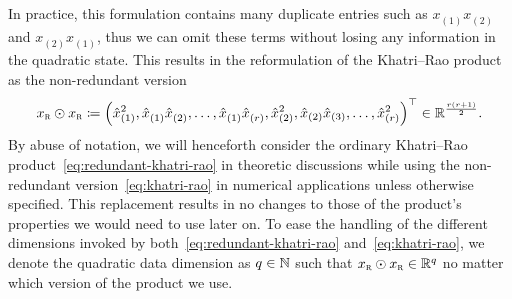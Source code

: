 In practice, this formulation contains many duplicate entries such as $x_{(1)}^{\phantom{1}} x_{(2)}^{\phantom{1}}$ and $x_{(2)}^{\phantom{1}} x_{(1)}^{\phantom{1}}$, thus we can omit these terms without losing any information in the quadratic state.
This results in the reformulation of the Khatri--Rao product as the non-redundant version
\begin{equation}\label{eq:khatri-rao}
    x_{\textnormal{\scshape r}} \odot x_{\textnormal{\scshape r}} \coloneqq {\left( \hat{x}_{(1)}^2, \hat{x}_{(1)}^{\phantom{1}} \hat{x}_{(2)}^{\phantom{1}}, \dots, \hat{x}_{(1)}^{\phantom{1}} \hat{x}_{(r)}^{\phantom{1}}, \hat{x}_{(2)}^2, \hat{x}_{(2)} \hat{x}_{(3)}, \dots, \hat{x}_{(r)}^2 \right)}^{\top} \in \mathbb{R}^{\frac{r (r + 1)}{2}}.
\end{equation}
By abuse of notation, we will henceforth consider the ordinary Khatri--Rao product~\eqref{eq:redundant-khatri-rao} in theoretic discussions while using the non-redundant version~\eqref{eq:khatri-rao} in numerical applications unless otherwise specified.
This replacement results in no changes to those of the product's properties we would need to use later on.
To ease the handling of the different dimensions invoked by both~\eqref{eq:redundant-khatri-rao} and~\eqref{eq:khatri-rao}, we denote the quadratic data dimension as $q \in \mathbb{N}$ such that $x_{\textnormal{\scshape r}} \odot x_{\textnormal{\scshape r}} \in \mathbb{R}^q$ no matter which version of the product we use.

